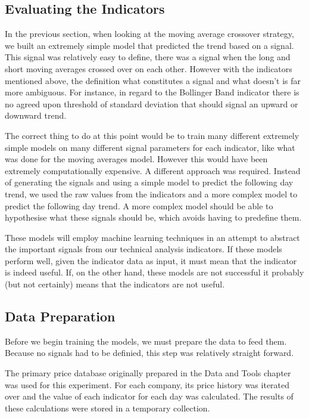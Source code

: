\documentclass{report}
\begin{document}
\subsection{Evaluating the Indicators}

In the previous section, when looking at the moving average crossover strategy, we built an extremely simple model that predicted the trend based on a signal. This signal was relatively easy to define, there was a signal when the long and short moving averages crossed over on each other. However with the indicators mentioned above, the definition what constitutes a signal and what doesn't is far more ambiguous. For instance, in regard to the Bollinger Band indicator there is no agreed upon threshold of standard deviation that should signal an upward or downward trend. 

The correct thing to do at this point would be to train many different extremely simple models on many different signal parameters for each indicator, like what was done for the moving averages model. However this would have been extremely computationally expensive. A different approach was required. Instead of generating the signals and using a simple model to predict the following day trend, we used the raw values from the indicators and a more complex model to predict the following day trend. A more complex model should be able to hypothesise what these signals should be, which avoids having to predefine them.

These models will employ machine learning techniques in an attempt to abstract the important signals from our technical analysis indicators. If these models perform well, given the indicator data as input, it must mean that the indicator is indeed useful. If, on the other hand, these models are not successful it probably (but not certainly) means that the indicators are not useful. 

\subsection{Data Preparation}

Before we begin training the models, we must prepare the data to feed them. Because no signals had to be definied, this step was relatively straight forward. 

The primary price database originally prepared in the Data and Tools chapter was used for this experiment. For each company, its price history was iterated over and the value of each indicator for each day was calculated. The results of these calculations were stored in a temporary collection. 
\end{document}
